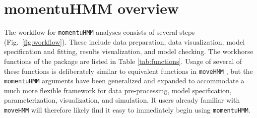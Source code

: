 \documentclass[12pt]{article}\usepackage[]{graphicx}\usepackage[]{color}
\begin{document}
\section{momentuHMM overview}
The workflow for \verb|momentuHMM| analyses consists of several steps (Fig.\ \ref{fig:workflow}). These include data preparation, data visualization, model specification and fitting, results visualization, and model checking. The workhorse functions of the package are listed in Table \ref{tab:functions}. Usage of several of these functions is deliberately similar to equivalent functions in \verb|moveHMM| \citep{MichelotEtAl2016}, but the \verb|momentuHMM| arguments have been generalized and expanded to accommodate a much more flexible framework for data pre-processing, model specification, parameterization, visualization, and simulation. R users already familiar with \verb|moveHMM| will therefore likely find it easy to immediately begin using \verb|momentuHMM|. %
\end{document}
